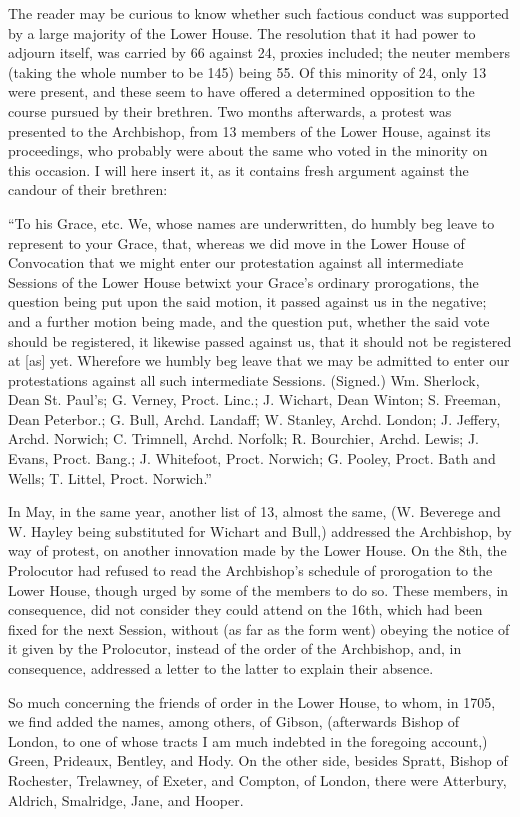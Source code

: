 The reader may be curious to
know whether such factious conduct was supported by a large majority
of the Lower House. The resolution that it had power to adjourn
itself, was carried by 66 against 24, proxies included; the neuter
members (taking the whole number to be 145) being 55. Of this minority
of 24, only 13 were present, and these seem to have offered a
determined opposition to the course pursued by their brethren. Two
months afterwards, a protest was presented to the Archbishop, from 13
members of the Lower House, against its proceedings, who probably were
about the same who voted in the minority on this occasion. I will here
insert it, as it contains fresh argument against the candour of their
brethren:

``To his Grace, etc. We, whose names are underwritten, do humbly beg leave
to represent to your Grace, that, whereas we did move in the Lower
House of Convocation that we might enter our
protestation against all intermediate Sessions of the Lower
House betwixt your Grace's ordinary prorogations, the question being
put upon the said motion, it passed against us in the negative; and a
further motion being made, and the question put, whether the said vote
should be registered, it likewise passed against us, that it should
not be registered at [as] yet. Wherefore we humbly beg leave that we
may be admitted to enter our protestations against all such
intermediate Sessions. (Signed.) Wm. Sherlock, Dean St. Paul's; G.
Verney, Proct. Linc.; J. Wichart, Dean Winton; S. Freeman, Dean
Peterbor.; G. Bull, Archd. Landaff; W. Stanley, Archd. London; J.
Jeffery, Archd. Norwich; C. Trimnell, Archd. Norfolk; R. Bourchier,
Archd. Lewis; J. Evans, Proct. Bang.; J. Whitefoot, Proct. Norwich; G.
Pooley, Proct. Bath and Wells; T. Littel, Proct. Norwich.''

In May, in the same year,
another list of 13, almost the same, (W. Beverege and W. Hayley being
substituted for Wichart and Bull,) addressed the Archbishop, by way of
protest, on another innovation made by the Lower House. On the 8th,
the Prolocutor had refused to read the Archbishop's schedule of
prorogation to the Lower House, though urged by some of the members to
do so. These members, in consequence, did not consider they could
attend on the 16th, which had been fixed for the next Session, without
(as far as the form went) obeying the notice of it given by the
Prolocutor, instead of the order of the Archbishop, and, in
consequence, addressed a letter to the latter to explain their
absence.

So much concerning the friends
of order in the Lower House, to whom, in 1705, we find added the
names, among others, of Gibson, (afterwards Bishop of London, to one
of whose tracts I am much indebted in the foregoing account,) Green,
Prideaux, Bentley, and Hody. On the other side, besides Spratt, Bishop
of Rochester, Trelawney, of Exeter, and Compton, of London, there were
Atterbury, Aldrich, Smalridge, Jane, and Hooper.


